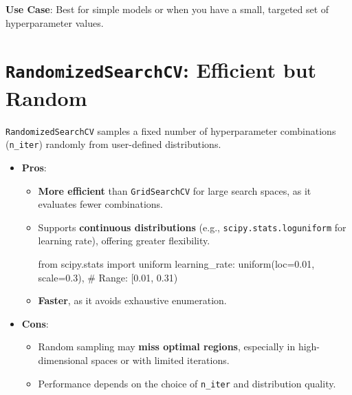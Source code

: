 \documentclass[
  letterpaper,
  DIV=11,
  numbers=noendperiod]{scrreprt}
\newenvironment{Shaded}{\begin{snugshade}}{\end{snugshade}}
\newcommand{\CommentTok}[1]{\textcolor[rgb]{0.37,0.37,0.37}{#1}}
\newcommand{\FloatTok}[1]{\textcolor[rgb]{0.68,0.00,0.00}{#1}}
\newcommand{\ImportTok}[1]{\textcolor[rgb]{0.00,0.46,0.62}{#1}}
\newcommand{\NormalTok}[1]{\textcolor[rgb]{0.00,0.23,0.31}{#1}}
\newcommand{\OperatorTok}[1]{\textcolor[rgb]{0.37,0.37,0.37}{#1}}
\providecommand{\tightlist}{%
  \setlength{\itemsep}{0pt}\setlength{\parskip}{0pt}}\usepackage{longtable,booktabs,array}
\begin{document}
\textbf{Use Case}: Best for simple models or when you have a small,
targeted set of hyperparameter values.

\section{\texorpdfstring{\texttt{RandomizedSearchCV}: Efficient but
Random}{RandomizedSearchCV: Efficient but Random}}\label{randomizedsearchcv-efficient-but-random}

\texttt{RandomizedSearchCV} samples a fixed number of hyperparameter
combinations (\texttt{n\_iter}) randomly from user-defined
distributions.

\begin{itemize}
\tightlist
\item
  \textbf{Pros}:

  \begin{itemize}
  \item
    \textbf{More efficient} than \texttt{GridSearchCV} for large search
    spaces, as it evaluates fewer combinations.
  \item
    Supports \textbf{continuous distributions} (e.g.,
    \texttt{scipy.stats.loguniform} for learning rate), offering greater
    flexibility.

\begin{Shaded}
\begin{Highlighting}[]
\ImportTok{from}\NormalTok{ scipy.stats }\ImportTok{import}\NormalTok{ uniform}
\CommentTok{\textquotesingle{}learning\_rate\textquotesingle{}}\NormalTok{: uniform(loc}\OperatorTok{=}\FloatTok{0.01}\NormalTok{, scale}\OperatorTok{=}\FloatTok{0.3}\NormalTok{),  }\CommentTok{\# Range: [0.01, 0.31)}
\end{Highlighting}
\end{Shaded}
  \item
    \textbf{Faster}, as it avoids exhaustive enumeration.
  \end{itemize}
\item
  \textbf{Cons}:

  \begin{itemize}
  \tightlist
  \item
    Random sampling may \textbf{miss optimal regions}, especially in
    high-dimensional spaces or with limited iterations.
  \item
    Performance depends on the choice of \texttt{n\_iter} and
    distribution quality.
  \end{itemize}
\end{itemize}
\end{document}
